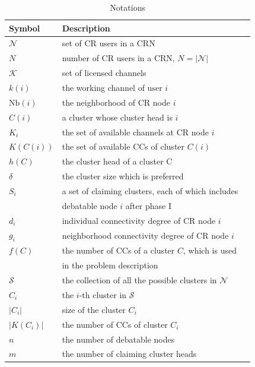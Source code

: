 \documentclass[10pt,journal,compsoc]{IEEEtran}
\theoremstyle{mytheoremstyle}
\theoremstyle{mytheoremstyle}
\theoremstyle{mytheoremstyle}
\begin{document}
\begin{table}[h!]
\caption{Notations}
\label{tab1}
\centering
\begin{tabular}{llr}
\toprule
Symbol & Description \\
\midrule
$\mathcal{N}$  & set of CR users in a CRN\\
$N$ & number of CR users in a CRN, $N=|\mathcal{N}|$\\
$\mathcal{K}$	& set of licensed channels\\
$k(i)$ & the working channel of user $i$\\
$\text{Nb}(i)$ & the neighborhood of CR node $i$    \\
$C(i)$ & a cluster whose cluster head is $i$  \\
$K_i$   & the set of available channels at CR node $i$  \\
$K(C(i))$   & the set of available CCs of cluster $C(i)$ \\
$h(C)$ & the cluster head of a cluster C\\
$\delta$ & the cluster size which is preferred\\
$S_i$ & a set of claiming clusters, each of which includes \\
& debatable node $i$ after phase I\\
$d_i$  & individual connectivity degree of CR node $i$\\
$g_i$  & neighborhood connectivity degree of CR node $i$\\
$f(C)$ & the number of CCs of a cluster $C$, which is used \\
& in the problem description\\
 $\mathcal{S}$ & the collection of all the possible clusters in $\mathcal{N}$\\
 $C_i$  & the $i$-th cluster in $\mathcal{S}$ \\
 $|C_i|$ & size of the cluster $C_i$\\
 $|K(C_i)|$ & the number of CCs of cluster $C_i$\\
 $n$ & the number of debatable nodes\\
 $m$ & the number of claiming cluster heads\\
\bottomrule
\end{tabular}
\end{table}
\end{document}
